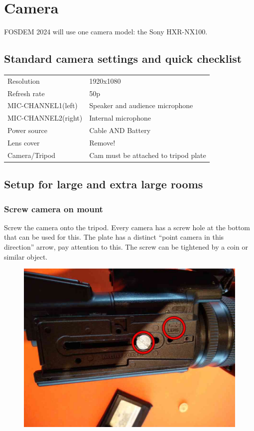 \documentclass{article}
\begin{document}
\clearpage

\section{Camera}
FOSDEM 2024 will use one camera model: the Sony HXR-NX100.

\subsection{Standard camera settings and quick checklist}
\begin{tabular}{| l | l |}
\hline
Resolution & 1920x1080 \\
Refresh rate & 50p \\
MIC-CHANNEL1(left) & Speaker and audience microphone \\
MIC-CHANNEL2(right) & Internal microphone \\
Power source & Cable AND Battery \\
Lens cover & Remove! \\
Camera/Tripod & Cam must be attached to tripod plate \\
\hline
\end{tabular}

\subsection{Setup for large and extra large rooms}

\subsubsection{Screw camera on mount}
Screw the camera onto the tripod. Every camera has a screw hole at the bottom that can be used for this. The plate has a distinct ``point camera in this direction'' arrow, pay attention to this. The screw can be tightened by a coin or similar object.

\begin{figure}[H]
  \centering
  \includegraphics[width = 120mm]{Cam00.jpg}
\end{figure}
\end{document}
